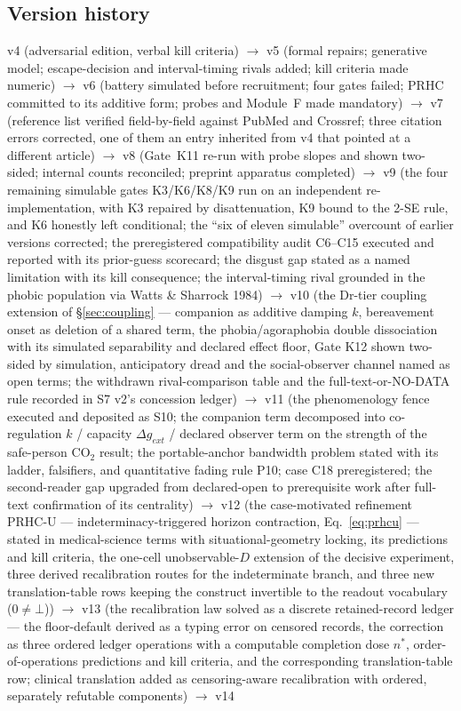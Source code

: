 \documentclass[9pt,twocolumn]{article}
\begin{document}
\subsection*{Version history}
v4 (adversarial edition, verbal kill criteria) $\rightarrow$ v5 (formal repairs; generative model; escape-decision and interval-timing rivals added; kill criteria made numeric) $\rightarrow$ v6 (battery simulated before recruitment; four gates failed; PRHC committed to its additive form; probes and Module~F made mandatory) $\rightarrow$ v7 (reference list verified field-by-field against PubMed and Crossref; three citation errors corrected, one of them an entry inherited from v4 that pointed at a different article) $\rightarrow$ v8 (Gate~K11 re-run with probe slopes and shown two-sided; internal counts reconciled; preprint apparatus completed) $\rightarrow$ v9 (the four remaining simulable gates K3/K6/K8/K9 run on an independent re-implementation, with K3 repaired by disattenuation, K9 bound to the 2-SE rule, and K6 honestly left conditional; the ``six of eleven simulable'' overcount of earlier versions corrected; the preregistered compatibility audit C6--C15 executed and reported with its prior-guess scorecard; the disgust gap stated as a named limitation with its kill consequence; the interval-timing rival grounded in the phobic population via Watts \& Sharrock 1984) $\rightarrow$ v10 (the Dr-tier coupling extension of \S\ref{sec:coupling} --- companion as additive damping $k$, bereavement onset as deletion of a shared term, the phobia/agoraphobia double dissociation with its simulated separability and declared effect floor, Gate K12 shown two-sided by simulation, anticipatory dread and the social-observer channel named as open terms; the withdrawn rival-comparison table and the full-text-or-NO-DATA rule recorded in S7 v2's concession ledger) $\rightarrow$ v11 (the phenomenology fence executed and deposited as S10; the companion term decomposed into co-regulation $k$ / capacity $\Delta g_{ext}$ / declared observer term on the strength of the safe-person CO$_2$ result; the portable-anchor bandwidth problem stated with its ladder, falsifiers, and quantitative fading rule P10; case C18 preregistered; the second-reader gap upgraded from declared-open to prerequisite work after full-text confirmation of its centrality) $\rightarrow$ v12 (the case-motivated refinement PRHC-U --- indeterminacy-triggered horizon contraction, Eq.~\ref{eq:prhcu} --- stated in medical-science terms with situational-geometry locking, its predictions and kill criteria, the one-cell unobservable-$D$ extension of the decisive experiment, three derived recalibration routes for the indeterminate branch, and three new translation-table rows keeping the construct invertible to the readout vocabulary ($0\neq\bot$)) $\rightarrow$ v13 (the recalibration law solved as a discrete retained-record ledger --- the floor-default derived as a typing error on censored records, the correction as three ordered ledger operations with a computable completion dose $n^{*}$, order-of-operations predictions and kill criteria, and the corresponding translation-table row; clinical translation added as censoring-aware recalibration with ordered, separately refutable components) $\rightarrow$ v14 
\end{document}
